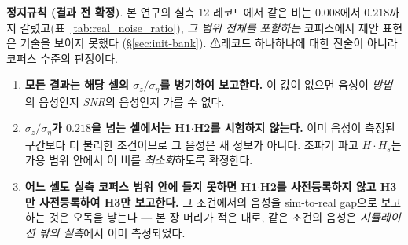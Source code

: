 \documentclass[11pt]{report}
\numberwithin{equation}{chapter}
\numberwithin{figure}{chapter}
\numberwithin{table}{chapter}
\begin{document}
\textbf{정지규칙 (결과 전 확정)}. 본 연구의 실측 12 레코드에서 같은 비는
$0.008$에서 $0.218$까지 갈렸고(표~\ref{tab:real_noise_ratio}),
\emph{그 범위 전체를 포함하는} 코퍼스에서 제안 표현은 기술을 보이지 못했다
(\S\ref{sec:init-bank}). ⚠레코드 하나하나에 대한 진술이 아니라 코퍼스 수준의 판정이다.
\begin{enumerate}
  \item \textbf{모든 결과는 해당 셀의 $\sigma_z/\sigma_\eta$를 병기하여 보고한다.}
        이 값이 없으면 음성이 \emph{방법}의 음성인지 \emph{SNR}의 음성인지 가를 수 없다.
  \item \textbf{$\sigma_z/\sigma_\eta$가 $0.218$을 넘는 셀에서는 H1$\cdot$H2를 시험하지
        않는다.} 이미 음성이 측정된 구간보다 더 불리한 조건이므로 그 음성은 새 정보가
        아니다. 조파기 파고 $H\cdot H_s$는 가용 범위 안에서 이 비를 \emph{최소화}하도록
        확정한다.
  \item \textbf{어느 셀도 실측 코퍼스 범위 안에 들지 못하면 H1$\cdot$H2를 사전등록하지
        않고 H3만 사전등록하여 H3만 보고한다.} 그 조건에서의 음성을
        sim-to-real gap으로 보고하는 것은 오독을 낳는다 --- 본 장 머리가 적은 대로,
        같은 조건의 음성은 \emph{시뮬레이션 밖의 실측}에서 이미 측정되었다.
%

\end{enumerate}
\end{document}
